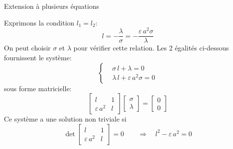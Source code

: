 \documentclass[
mode=present,    %
paper=a4paper,   %
orient=landscape,
display=slides,   %
size=10pt,
style=romain   %
]{powerdot}
\begin{document}
\begin{slide}[toc=]{Extension à plusieurs équations}

Exprimons la condition $l_1=l_2$:
        \begin{equation*}
l = -\frac{\lambda}{\sigma} = -\frac{\varepsilon\, a^2 \sigma}{\lambda}
        \end{equation*}
On peut choisir $\sigma$ et $\lambda$ pour vérifier cette relation. Les 2 égalités ci-dessous fournissent le système:
        \begin{equation*}
            \left\{
            \begin{aligned}
                & \sigma\,l+\lambda = 0   \\
                & \lambda\,l +\varepsilon\, a^2 \sigma = 0
            \end{aligned}
            \right.
        \end{equation*}
sous forme matricielle:
        \begin{equation*}
            \begin{bmatrix}
                 l   & 1   \\
                \varepsilon\, a^2 & l
            \end{bmatrix}
            \begin{bmatrix}
                 \sigma   \\
                \lambda
            \end{bmatrix}
            =
            \begin{bmatrix}
                 0  \\
                0
            \end{bmatrix}
        \end{equation*}
Ce système a une solution non triviale si
        \begin{equation*}
            \det \begin{bmatrix}
                 l   & 1   \\
                \varepsilon\, a^2 & l
            \end{bmatrix}
            =0
            \qquad
            \Rightarrow \quad
            l^2-\varepsilon\, a^2 = 0
        \end{equation*}
\end{slide}
\end{document}
